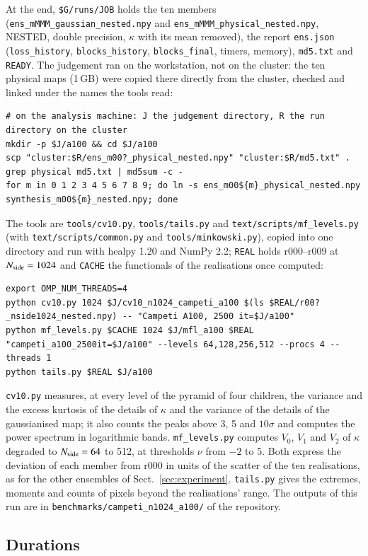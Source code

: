 \documentclass{aa}
\newcommand{\nside}{N_{\rm side}}
\begin{document}
At the end, \texttt{\$G/runs/JOB} holds the ten members (\texttt{ens\_mMMM\_gaussian\_nested.npy} and \texttt{ens\_mMMM\_physical\_nested.npy}, NESTED, double precision, $\kappa$ with its mean removed), the report \texttt{ens.json} (\texttt{loss\_history}, \texttt{blocks\_history}, \texttt{blocks\_final}, timers, memory), \texttt{md5.txt} and \texttt{READY}. The judgement ran on the workstation, not on the cluster: the ten physical maps (1\,GB) were copied there directly from the cluster, checked and linked under the names the tools read:
\begin{lstlisting}
# on the analysis machine: J the judgement directory, R the run directory on the cluster
mkdir -p $J/a100 && cd $J/a100
scp "cluster:$R/ens_m00?_physical_nested.npy" "cluster:$R/md5.txt" .
grep physical md5.txt | md5sum -c -
for m in 0 1 2 3 4 5 6 7 8 9; do ln -s ens_m00${m}_physical_nested.npy synthesis_m00${m}_nested.npy; done
\end{lstlisting}
The tools are \texttt{tools/cv10.py}, \texttt{tools/tails.py} and \texttt{text/scripts/mf\_levels.py} (with \texttt{text/scripts/common.py} and \texttt{tools/minkowski.py}), copied into one directory and run with healpy 1.20 and NumPy 2.2; \texttt{REAL} holds r000--r009 at $\nside=1024$ and \texttt{CACHE} the functionals of the realisations once computed:
\begin{lstlisting}
export OMP_NUM_THREADS=4
python cv10.py 1024 $J/cv10_n1024_campeti_a100 $(ls $REAL/r00?_nside1024_nested.npy) -- "Campeti A100, 2500 it=$J/a100"
python mf_levels.py $CACHE 1024 $J/mfl_a100 $REAL "campeti_a100_2500it=$J/a100" --levels 64,128,256,512 --procs 4 --threads 1
python tails.py $REAL $J/a100
\end{lstlisting}
\texttt{cv10.py} measures, at every level of the pyramid of four children, the variance and the excess kurtosis of the details of $\kappa$ and the variance of the details of the gaussianised map; it also counts the peaks above 3, 5 and $10\sigma$ and computes the power spectrum in logarithmic bands. \texttt{mf\_levels.py} computes $V_0$, $V_1$ and $V_2$ of $\kappa$ degraded to $\nside=64$ to 512, at thresholds $\nu$ from $-2$ to 5. Both express the deviation of each member from r000 in units of the scatter of the ten realisations, as for the other ensembles of Sect.~\ref{sec:experiment}. \texttt{tails.py} gives the extremes, moments and counts of pixels beyond the realisations' range. The outputs of this run are in \texttt{benchmarks/campeti\_n1024\_a100/} of the repository.

\subsection{Durations}
\end{document}
